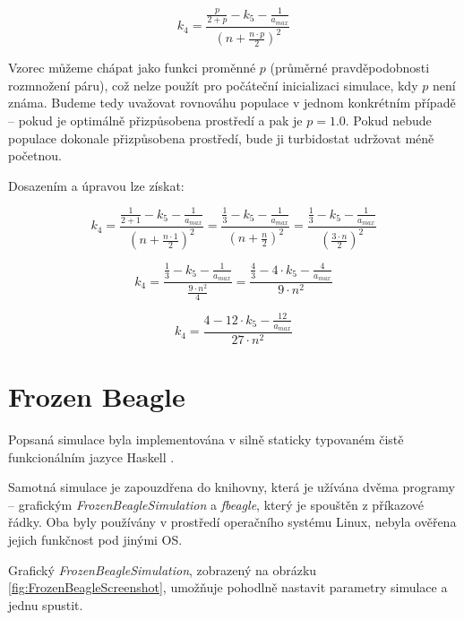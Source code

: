 \begin{tcolorbox}[ title={Odvození vzorce pro $k_4$}
                 , breakable
                 ]
\begin{equation}
k_4  = \frac{\frac{p}{2 + p} -  {k_5} - \frac{1}{a_{max}}}{(n + \frac{n\cdot{}p}{2})^2}
\end{equation}


Vzorec můžeme chápat jako funkci proměnné $p$ (průměrné pravděpodobnosti rozmnožení páru), což nelze použít  pro
počáteční inicializaci simulace, kdy $p$ není známa. Budeme tedy uvažovat rovnováhu populace v jednom konkrétním
případě -- pokud je optimálně přizpůsobena prostředí a pak je $p = 1.0$. Pokud nebude populace dokonale přizpůsobena
prostředí, bude ji turbidostat udržovat méně početnou.

Dosazením a úpravou lze získat:



\begin{equation}
k_4  = \frac{\frac{1}{2 + 1} -  {k_5} - \frac{1}{a_{max}}}{(n + \frac{n\cdot{}1}{2})^2}
     = \frac{\frac{1}{3} -  {k_5} - \frac{1}{a_{max}}}{(n + \frac{n}{2})^2}
     = \frac{\frac{1}{3} -  {k_5} - \frac{1}{a_{max}}}{(\frac{3\cdot{}n}{2})^2}
\end{equation}

\begin{equation}
k_4  = \frac{\frac{1}{3} -  {k_5} - \frac{1}{a_{max}}}{\frac{9\cdot{}n^2}{4}}
     = \frac{\frac{4}{3} - 4\cdot{}{k_5} - \frac{4}{a_{max}}}{9\cdot{}n^2}
\end{equation}

\begin{equation}
k_4  = \frac{4 - 12\cdot{}{k_5} - \frac{12}{a_{max}}}{27\cdot{}n^2}
\end{equation}
\end{tcolorbox}

\section{Frozen Beagle}

Popsaná simulace byla implementována v silně staticky typovaném čistě funkcionálním jazyce Haskell \citep{Haskell}.

Samotná simulace je zapouzdřena do knihovny, která je užívána dvěma programy -- grafickým
\textit{FrozenBeagleSimulation} a \textit{fbeagle}, který je spouštěn z příkazové řádky. Oba byly používány v prostředí
operačního systému Linux, nebyla ověřena jejich funkčnost pod jinými OS.

Grafický \textit{FrozenBeagleSimulation}, zobrazený na obrázku \ref{fig:FrozenBeagleScreenshot},
umožňuje pohodlně nastavit parametry simulace a jednu spustit.

